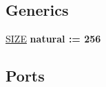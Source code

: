 \subsection*{Generics}
 \begin{DoxyCompactItemize}
\item 
\mbox{\label{classFIFO_ad061e94816abc61306c720c7ed29868b}} 
\hyperlink{classFIFO_ad061e94816abc61306c720c7ed29868b}{S\+I\+ZE} {\bfseries {\bfseries \textcolor{vhdlchar}{natural}\textcolor{vhdlchar}{ }\textcolor{vhdlchar}{ }\textcolor{vhdlchar}{\+:}\textcolor{vhdlchar}{=}\textcolor{vhdlchar}{ }\textcolor{vhdlchar}{ } \textcolor{vhdldigit}{256} \textcolor{vhdlchar}{ }}}
\end{DoxyCompactItemize}
\subsection*{Ports}

